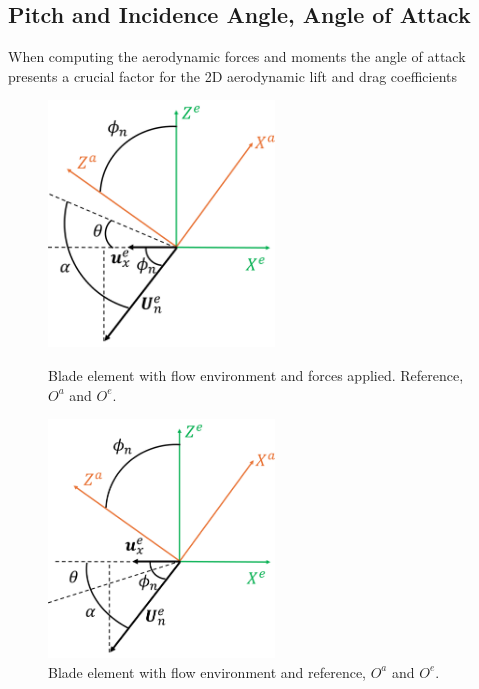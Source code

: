 \subsection{ Pitch and Incidence Angle, Angle of Attack}

When computing the aerodynamic forces and moments the angle of attack presents a crucial factor for the 2D aerodynamic lift and drag coefficients 

\begin{figure}[!htb]
    \centering
    \begin{minipage}[b]{0.48\textwidth}
        \centering
        \includegraphics[width=6cm]{Figures/background/bet/angles_theta_pos.png}
        \caption{Blade element with flow environment and forces applied. Reference, $O^a$ and $O^e$.}
        \label{fig:phi_angle_pos}
    \end{minipage}
    \hfill
    \begin{minipage}[b]{0.48\textwidth}
        \centering
        \includegraphics[width=6cm]{Figures/background/bet/angles_theta_neg.png}
        \caption{Blade element with flow environment and reference, $O^a$ and $O^e$.}
        \label{fig:phi_angle_neg}
    \end{minipage}
\end{figure}

